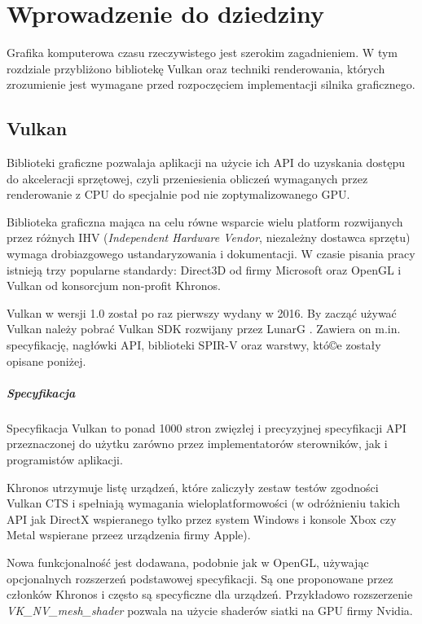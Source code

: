 \chapter{Wprowadzenie do dziedziny}
\label{chap:field}

Grafika komputerowa czasu rzeczywistego jest szerokim zagadnieniem.
W tym rozdziale przybliżono bibliotekę Vulkan oraz techniki renderowania, których zrozumienie jest wymagane przed rozpoczęciem implementacji silnika graficznego.

\section{Vulkan}

Biblioteki graficzne pozwalaja aplikacji na użycie ich API do uzyskania dostępu do akceleracji sprzętowej, czyli przeniesienia obliczeń wymaganych przez renderowanie z CPU do specjalnie pod nie zoptymalizowanego GPU.

Biblioteka graficzna mająca na celu równe wsparcie wielu platform rozwijanych przez różnych IHV (\textit{Independent Hardware Vendor}, niezależny dostawca sprzętu) wymaga drobiazgowego ustandaryzowania i dokumentacji.
W czasie pisania pracy istnieją trzy popularne standardy: Direct3D od firmy Microsoft oraz OpenGL i Vulkan od konsorcjum non-profit Khronos.

Vulkan w wersji 1.0 został po raz pierwszy wydany w 2016. By zacząć używać Vulkan należy pobrać Vulkan SDK rozwijany przez LunarG \cite{VULKANSDK}.
Zawiera on m.in. specyfikację, nagłówki API, biblioteki SPIR-V oraz warstwy, któ©e zostały opisane poniżej.

\paragraph{Specyfikacja}

Specyfikacja Vulkan \cite{VULKANSPEC} to ponad 1000 stron zwięzłej i precyzyjnej specyfikacji API przeznaczonej do użytku zarówno przez implementatorów sterowników, jak i programistów aplikacji.

Khronos utrzymuje listę urządzeń, które zaliczyły zestaw testów zgodności Vulkan CTS \cite{VULKANCTS} i spełniają wymagania wieloplatformowości (w odróżnieniu takich API jak DirectX wspieranego tylko przez system Windows i konsole Xbox \cite{HughesDamEtAl13} czy Metal wspierane przeez urządzenia firmy Apple).

Nowa funkcjonalność jest dodawana, podobnie jak w OpenGL, używając opcjonalnych rozszerzeń podstawowej specyfikacji. Są one proponowane przez członków Khronos i często są specyficzne dla urządzeń.
Przykładowo rozszerzenie \textit{VK\_NV\_mesh\_shader} pozwala na użycie shaderów siatki na GPU firmy Nvidia.

